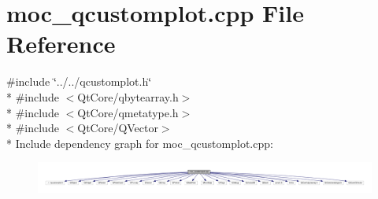 \hypertarget{a00016}{\section{moc\+\_\+qcustomplot.\+cpp File Reference}
\label{a00016}
}
{\ttfamily \#include \char`\"{}../../qcustomplot.\+h\char`\"{}}\\*
{\ttfamily \#include $<$Qt\+Core/qbytearray.\+h$>$}\\*
{\ttfamily \#include $<$Qt\+Core/qmetatype.\+h$>$}\\*
{\ttfamily \#include $<$Qt\+Core/\+Q\+Vector$>$}\\*
Include dependency graph for moc\+\_\+qcustomplot.\+cpp\+:
\nopagebreak
\begin{figure}[H]
\begin{center}
\leavevmode
\includegraphics[width=350pt]{d0/d48/a00165}
\end{center}
\end{figure}
